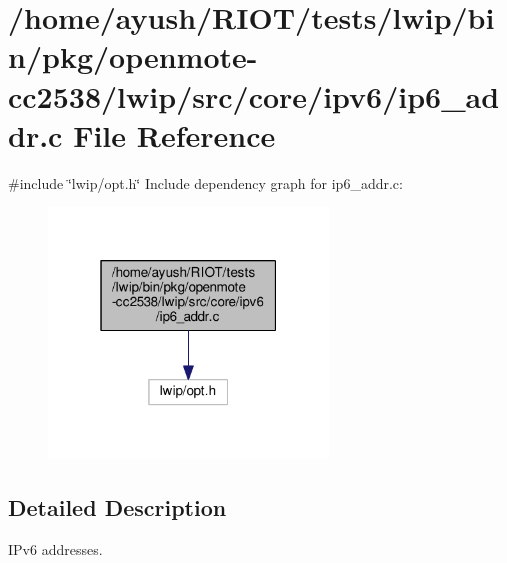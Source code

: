 \hypertarget{openmote-cc2538_2lwip_2src_2core_2ipv6_2ip6__addr_8c}{}\section{/home/ayush/\+R\+I\+O\+T/tests/lwip/bin/pkg/openmote-\/cc2538/lwip/src/core/ipv6/ip6\+\_\+addr.c File Reference}
\label{openmote-cc2538_2lwip_2src_2core_2ipv6_2ip6__addr_8c}
{\ttfamily \#include \char`\"{}lwip/opt.\+h\char`\"{}}\newline
Include dependency graph for ip6\+\_\+addr.\+c\+:
\nopagebreak
\begin{figure}[H]
\begin{center}
\leavevmode
\includegraphics[width=211pt]{openmote-cc2538_2lwip_2src_2core_2ipv6_2ip6__addr_8c__incl}
\end{center}
\end{figure}


\subsection{Detailed Description}
I\+Pv6 addresses. 